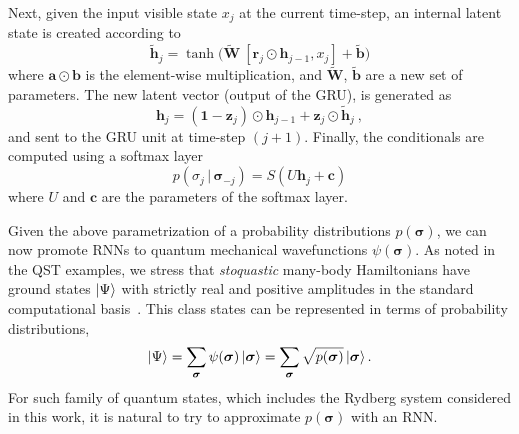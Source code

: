 \documentclass[twocolumn,english,reprint,superscriptaddress,longbibliography,pra]{revtex4-1}
\begin{document}
Next, given the input visible state $x_j$ at the current time-step, an internal latent state is created according to
\begin{equation}
\bm{\tilde{h}}_j = \tanh\Big(\bm{\tilde{W}}\:[\bm{r}_j\odot\bm{h}_{j-1},x_j]+\bm{\tilde{b}}\Big)
\end{equation}
where $\bm{a}\odot\bm{b}$ is the element-wise multiplication, and $\bm{\tilde{W
}}$, $\bm{\tilde{b}}$ are a new set of parameters. The new latent vector (output of the GRU), is generated as
\begin{equation}
\bm{h}_j=(\bm{1}-\bm{z}_j)\odot\bm{h}_{j-1}+\bm{z}_j\odot\bm{\tilde{h}}_j\:,
\end{equation}
and sent to the GRU unit at time-step $(j+1)$. Finally, the conditionals are computed using a softmax layer
\begin{equation}
    p(\sigma_j \,|\,\bm{\sigma}_{-j}) = S\left( U \bm{h}_j + \bm{c}\right)
\end{equation}
where $U$ and $\bm{c}$ are the parameters of the softmax layer. 

Given the above parametrization of a probability distributions $p(\bm{\sigma})$, we can now promote RNNs to quantum mechanical wavefunctions $\psi(\bm{\sigma})$. As noted in the QST examples, we stress that {\it stoquastic} many-body
Hamiltonians have ground states $\ket{\Psi}$ with strictly real and positive amplitudes in the standard computational basis~\cite{Bravyi2006}.
This class states can be represented in terms of probability distributions,
\begin{align}
    \ket{\Psi} = \sum_{\bm{\sigma}} \psi(\bm{\sigma})\ket{\bm{\sigma}} = \sum_{\bm{\sigma}}\sqrt{p(\bm{\sigma})}\ket{\bm{\sigma}}.
\end{align}
For such family of quantum states, which includes the Rydberg system considered in this work, it is natural to try to approximate $p(\bm{\sigma})$ with an RNN.
\end{document}
